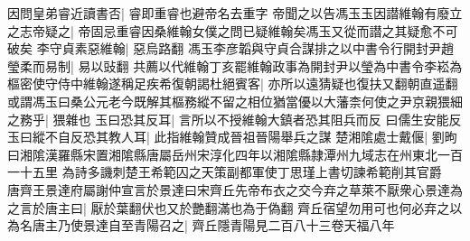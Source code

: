 因問皇弟睿近讀書否|{
	睿即重睿也避帝名去重字}
帝聞之以告馮玉玉因譛維翰有廢立之志帝疑之|{
	帝固忌重睿因桑維翰女僕之問已疑維翰矣馮玉又從而譛之其疑愈不可破矣}
李守貞素惡維翰|{
	惡烏路翻}
馮玉李彦韜與守貞合謀排之以中書令行開封尹趙瑩柔而易制|{
	易以䜴翻}
共薦以代維翰丁亥罷維翰政事為開封尹以瑩為中書令李崧為樞密使守侍中維翰遂稱足疾希復朝謁杜絕賓客|{
	亦所以遠猜疑也復扶又翻朝直遥翻}
或謂馮玉曰桑公元老今既解其樞務縱不留之相位猶當優以大藩柰何使之尹京親猥細之務乎|{
	猥雜也}
玉曰恐其反耳|{
	言所以不授維翰大鎮者恐其阻兵而反}
曰儒生安能反玉曰縱不自反恐其教人耳|{
	此指維翰贊成晉祖晉陽舉兵之謀}
楚湘隂處士戴偃|{
	劉昫曰湘隂漢羅縣宋置湘隂縣唐屬岳州宋淳化四年以湘隂縣隷潭州九域志在州東北一百一十五里}
為詩多譏刺楚王希範囚之天策副都軍使丁思瑾上書切諫希範削其官爵　唐齊王景達府屬謝仲宣言於景達曰宋齊丘先帝布衣之交今弃之草萊不厭衆心景達為之言於唐主曰|{
	厭於葉翻伏也又於艷翻滿也為于偽翻}
齊丘宿望勿用可也何必弃之以為名唐主乃使景達自至青陽召之|{
	齊丘隱青陽見二百八十三卷天福八年}


